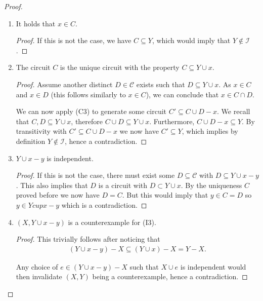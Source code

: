 \begin{proof}
\begin{enumerate}
\begin{enumerate}
\begin{enumerate}
                We will make use of this $y$ in the rest of the proof.
              \item It holds that $x \in C$.
                \begin{proof}
                  If this is not the case, we have $C \subseteq Y$, which would imply that $Y \not\in \mathcal I$.
                \end{proof}
              \item The circuit $C$ is the unique circuit with the property $C \subseteq Y \cup x.$
                \begin{proof}
                  Assume another distinct $D \in \mathcal C$ exists such that $D \subseteq Y \cup x$. As $x \in C$ and $x \in D$ (this follows similarly to $x \in C$), we can conclude that $x \in C \cap D$. 

                  We can now apply (C3) to generate some circuit $C' \subseteq  C \cup D - x$. We recall that $C, D \subseteq Y \cup x$, therefore $C \cup D \subseteq Y \cup x$. Furthermore, $C \cup D - x \subseteq Y$. By transitivity with $C' \subseteq C \cup D - x$ we now have $C' \subseteq Y$, which implies by definition $Y \not\in \mathcal I$, hence a contradiction.
                \end{proof}


              \item $Y \cup x - y$ is independent. 

                \begin{proof}
                If this is not the case, there must exist some $D \subseteq \mathcal C$ with $D \subseteq Y \cup x - y$. This also implies that $D$ is a circuit with $D \subset Y \cup x$. By the uniqueness $C$ proved before we now have $D = C$. But this would imply that $y\in C = D$ so $y \in Y cup x - y$ which is a contradiction.
                \end{proof}

              \item $(X, Y \cup x - y)$ is a counterexample for (I3).

                \begin{proof}
                  This trivially follows after noticing that 
                  \begin{align*}
                  (Y \cup x - y) - X \subseteq (Y \cup x) - X = Y - X.
                  \end{align*}

                  Any choice of $e \in (Y \cup x - y) - X$ such that $X \cup e$ is independent would then invalidate $(X, Y)$ being a counterexample, hence a contradiction.
                \end{proof}
            \end{enumerate}


\end{enumerate}
\end{enumerate}
\end{proof}
